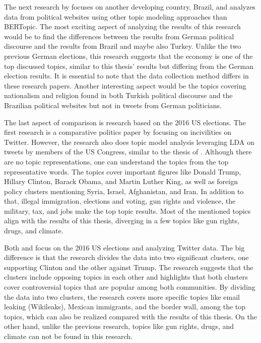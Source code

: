 The next research by \textcite{stier_brazil_election_2018} focuses on another developing country, 
Brazil, and analyzes data from political websites using other topic modeling approaches than 
BERTopic. The most exciting aspect of analyzing the results of this research would be to find the 
differences between the results from German political discourse and the results from Brazil and maybe 
also Turkey. Unlike the two previous German elections, this research suggests that the economy is 
one of the top discussed topics, similar to this thesis' results but differing from the German 
election results. It is essential to note that the data collection method differs in these research 
papers. Another interesting aspect would be the topics covering nationalism and religion found in 
both Turkish political discourse and the Brazilian political websites but not in tweets from German 
politicians.

The last aspect of comparison is research based on the 2016 US elections. The first research is a 
comparative politics paper by \textcite{theocharis_twitter_political_incivility_2020} focusing on 
incivilities on Twitter. However, the research also does topic model analysis leveraging LDA on tweets
by members of the US Congress, similar to the thesis of 
\textcite{bertopic_twitter_german_politics_2022}. Although there are no topic representations, one 
can understand the topics from the top representative words. The topics cover important figures like 
Donald Trump, Hillary Clinton, Barack Obama, and Martin Luther King, as well as foreign policy 
clusters mentioning Syria, Israel, Afghanistan, and Iran. In addition to that, illegal immigration, 
elections and voting, gun rights and violence, the military, tax, and jobs make the top topic results. 
Most of the mentioned topics align with the results of this thesis, diverging in a few topics like 
gun rights, drugs, and climate.

Both \textcite{fang_US_elections_2019} and \textcite{fang_US_elections_thesis_2019} focus on the 
2016 US elections and analyzing Twitter data. The big difference is that the research divides the 
data into two significant clusters, one supporting Clinton and the other against Trump. The research 
suggests that the clusters include opposing topics in each other and highlights that both clusters 
cover controversial topics that are popular among both communities. By dividing the data into two 
clusters, the research covers more specific topics like email leaking (Wikileaks), Mexican immigrants, 
and the border wall, among the top topics, which can also be realized compared with the results of 
this thesis. On the other hand, unlike the previous research, topics like gun rights, drugs, and 
climate can not be found in this research. 

